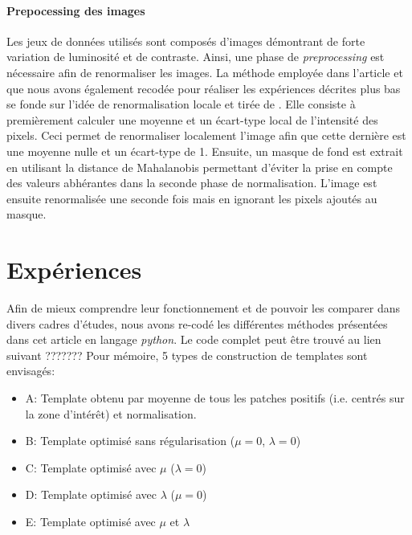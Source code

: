 \documentclass{article}
\begin{document}
\paragraph{Prepocessing des images}
Les jeux de données utilisés sont composés d'images démontrant de forte variation de luminosité et de contraste. Ainsi, une 
phase de \textit{preprocessing} est nécessaire afin de renormaliser les images. La méthode employée dans l'article et que nous 
avons également recodée pour réaliser les expériences décrites plus bas se fonde sur l'idée de renormalisation locale et tirée de \cite{preprocessing}. Elle consiste
à premièrement calculer une moyenne et un écart-type local de l'intensité des pixels. Ceci permet de renormaliser localement l'image afin 
que cette dernière est une moyenne nulle et un écart-type de 1. Ensuite, un masque de fond est extrait en utilisant la distance de Mahalanobis 
permettant d'éviter la prise en compte des valeurs abhérantes dans la seconde phase de normalisation. L'image est ensuite renormalisée une seconde 
fois mais en ignorant les pixels ajoutés au masque.



\section{Expériences} \label{part:expe}

Afin de mieux comprendre leur fonctionnement et de pouvoir les comparer dans 
divers cadres d'études, nous avons re-codé les différentes méthodes présentées dans cet article 
en langage \textit{python}. Le code complet peut être trouvé au lien suivant ???????
Pour mémoire, 5 types de construction de templates sont envisagés:
\begin{itemize}
    \item A: Template obtenu par moyenne de tous les patches positifs (i.e. centrés sur la zone d'intérêt) et normalisation.
    \item B: Template optimisé sans régularisation ($\mu =0$, $\lambda = 0$)
    \item C: Template optimisé avec $\mu$ ($\lambda=0$)
    \item D: Template optimisé avec $\lambda$ ($\mu = 0$)
    \item E: Template optimisé avec $\mu$ et $\lambda$
\end{itemize}
\end{document}
